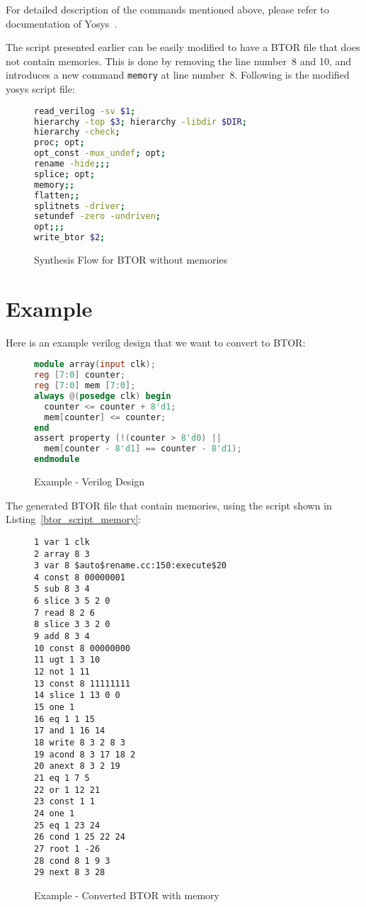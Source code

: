 \documentclass[9pt,technote,a4paper]{IEEEtran}
\begin{document}
For detailed description of the commands mentioned above, please refer
to documentation of Yosys~\cite{yosys}.

The script presented earlier can be easily modified to have a BTOR
file that does not contain memories. This is done by removing the line
number~8 and 10, and introduces a new command {\tt memory} at line
number~8.  Following is the modified yosys script file:

\begin{figure}[H]
\begin{lstlisting}[language=sh]
read_verilog -sv $1; 
hierarchy -top $3; hierarchy -libdir $DIR; 
hierarchy -check; 
proc; opt; 
opt_const -mux_undef; opt;
rename -hide;;;
splice; opt;
memory;;
flatten;;
splitnets -driver;
setundef -zero -undriven;
opt;;;
write_btor $2;
\end{lstlisting}
 \renewcommand{\figurename}{Listing}
\caption{Synthesis Flow for BTOR without memories}
\label{btor_script_without_memory}
\end{figure}

\section{Example}

Here is an example verilog design that we want to convert to BTOR:

\begin{figure}[H]
\begin{lstlisting}[language=Verilog]
module array(input clk);
reg [7:0] counter;
reg [7:0] mem [7:0];
always @(posedge clk) begin
  counter <= counter + 8'd1;
  mem[counter] <= counter;
end
assert property (!(counter > 8'd0) || 
  mem[counter - 8'd1] == counter - 8'd1);
endmodule
\end{lstlisting}
\renewcommand{\figurename}{Listing}
\caption{Example - Verilog Design}
\label{example_verilog}
\end{figure}

The generated BTOR file that contain memories, using the script shown
in Listing~\ref{btor_script_memory}:
\begin{figure}[H]
\begin{lstlisting}[numbers=none]
1 var 1 clk
2 array 8 3
3 var 8 $auto$rename.cc:150:execute$20
4 const 8 00000001
5 sub 8 3 4
6 slice 3 5 2 0
7 read 8 2 6
8 slice 3 3 2 0
9 add 8 3 4
10 const 8 00000000
11 ugt 1 3 10
12 not 1 11
13 const 8 11111111
14 slice 1 13 0 0
15 one 1
16 eq 1 1 15
17 and 1 16 14
18 write 8 3 2 8 3
19 acond 8 3 17 18 2
20 anext 8 3 2 19
21 eq 1 7 5
22 or 1 12 21
23 const 1 1
24 one 1
25 eq 1 23 24
26 cond 1 25 22 24
27 root 1 -26
28 cond 8 1 9 3
29 next 8 3 28
\end{lstlisting}
\renewcommand{\figurename}{Listing}
\caption{Example - Converted BTOR with memory}
\label{example_btor}
\end{figure}
\end{document}
